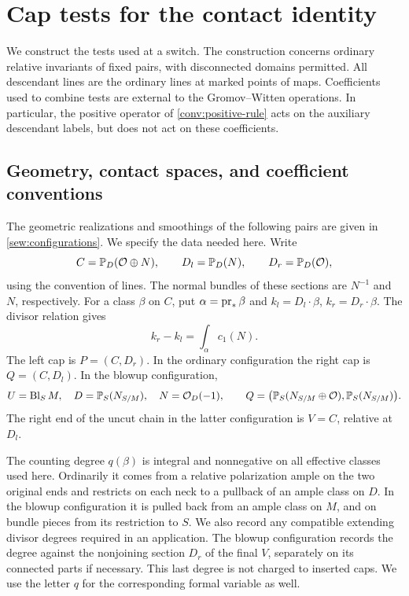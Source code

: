 \section{Cap tests for the contact identity}\label{cap:section}

We construct the tests used at a switch.  The construction concerns ordinary
relative invariants of fixed pairs, with disconnected domains permitted.
All descendant lines are the ordinary lines at marked points of maps.
Coefficients used to combine tests are external to the Gromov--Witten
operations.  In particular, the positive operator of
\cref{conv:positive-rule} acts on the auxiliary descendant labels, but does
not act on these coefficients.

\subsection{Geometry, contact spaces, and coefficient conventions}
\label{cap:setup}

The geometric realizations and smoothings of the following pairs are given
in \cref{sew:configurations}.  We specify the data needed here.  Write
\[
 C=\mathbb P_D(\mathcal O\oplus N),\qquad
 D_l=\mathbb P_D(N),\qquad D_r=\mathbb P_D(\mathcal O),
\]
using the convention of lines.  The normal bundles of these sections are
$N^{-1}$ and $N$, respectively.  For a class $\beta$ on $C$, put
$\alpha=\operatorname{pr}_*\beta$ and $k_l=D_l\cdot\beta$, $k_r=D_r\cdot\beta$.
The divisor relation gives
\begin{equation}\label{cap:flux}
 k_r-k_l=\int_\alpha c_1(N).
\end{equation}
The left cap is $P=(C,D_r)$.  In the ordinary configuration the right cap is
$Q=(C,D_l)$.  In the blowup configuration,
\[
 U=\operatorname{Bl}_S M,\quad D=\mathbb P_S(N_{S/M}),\quad N=\mathcal O_D(-1),\qquad
 Q=\bigl(\mathbb P_S(N_{S/M}\oplus\mathcal O),\mathbb P_S(N_{S/M})\bigr).
\]
The right end of the uncut chain in the latter configuration is $V=C$,
relative at $D_l$.

The counting degree $q(\beta)$ is integral and nonnegative on all effective
classes used here.  Ordinarily it comes from a relative polarization ample
on the two original ends and restricts on each neck to a pullback of an
ample class on $D$.  In the blowup configuration it is pulled back from an
ample class on $M$, and on bundle pieces from its restriction to $S$.
We also record any compatible extending divisor degrees required in an
application.  The blowup configuration records the degree against the
nonjoining section $D_r$ of the final $V$, separately on its connected
parts if necessary.  This last degree is not charged to inserted caps.
We use the letter $q$ for the corresponding formal variable as well.

